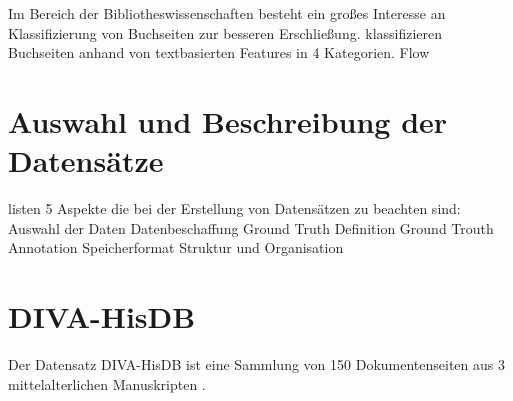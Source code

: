 Im Bereich der Bibliotheswissenschaften besteht ein großes Interesse an Klassifizierung von
Buchseiten zur besseren Erschließung.
\cite{McConnaugheyLabeledSegmentationPrinted2017} klassifizieren Buchseiten anhand von textbasierten Features in 4 Kategorien. 
Flow

\section{Auswahl und Beschreibung der Datensätze}
\textcite[985\psqq]{DoermannHandbookdocumentimage2014} listen 5 Aspekte die bei der Erstellung von Datensätzen zu beachten sind:
Auswahl der Daten
Datenbeschaffung
Ground Truth Definition
Ground Trouth Annotation
Speicherformat
Struktur und Organisation

\section{DIVA-HisDB}
Der Datensatz DIVA-HisDB ist eine Sammlung von 150 Dokumentenseiten aus 3 mittelalterlichen Manuskripten \autocite{SimistiraICDAR2017CompetitionLayout2017}.
